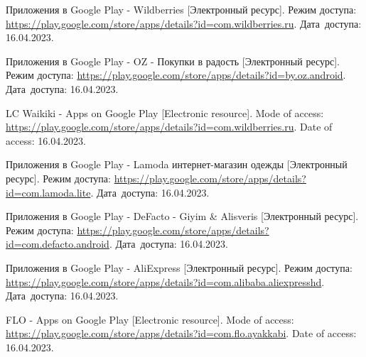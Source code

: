 \begingroup

  \renewcommand{\addcontentsline}[3]{}%
  \renewcommand{\section}[2]{}%

  \begin{thebibliography}{}

    Приложения в Google Play - Wildberries
    [Электронный ресурс].
    Режим доступа: \url{https://play.google.com/store/apps/details?id=com.wildberries.ru}.
    Дата~доступа: 16.04.2023.

    Приложения в Google Play - OZ - Покупки в радость
    [Электронный ресурс].
    Режим доступа: \url{https://play.google.com/store/apps/details?id=by.oz.android}.
    Дата~доступа: 16.04.2023.

    LC Waikiki - Apps on Google Play
    [Electronic resource].
    Mode of access: \url{https://play.google.com/store/apps/details?id=com.wildberries.ru}.
    Date of access: 16.04.2023.

    Приложения в Google Play - Lamoda интернет-магазин одежды
    [Электронный ресурс].
    Режим доступа: \url{https://play.google.com/store/apps/details?id=com.lamoda.lite}.
    Дата~доступа: 16.04.2023.

    Приложения в Google Play - DeFacto - Giyim \& Alisveris %
    [Электронный ресурс].
    Режим доступа: \url{https://play.google.com/store/apps/details?id=com.defacto.android}.
    Дата~доступа: 16.04.2023.

    Приложения в Google Play - AliExpress
    [Электронный ресурс].
    Режим доступа: \url{https://play.google.com/store/apps/details?id=com.alibaba.aliexpresshd}.
    Дата~доступа: 16.04.2023.

    FLO - Apps on Google Play
    [Electronic resource].
    Mode of access: \url{https://play.google.com/store/apps/details?id=com.flo.ayakkabi}.
    Date of access: 16.04.2023.


\end{thebibliography}
